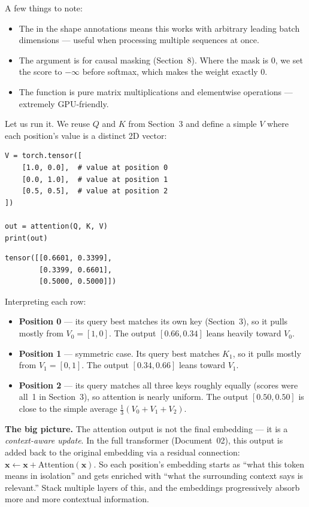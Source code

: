 A few things to note:
\begin{itemize}
  \item The \code{*} in the shape annotations means this works with arbitrary leading batch dimensions --- useful when processing multiple sequences at once.
  \item The  argument is for causal masking (Section~8). Where the mask is 0, we set the score to $-\infty$ before softmax, which makes the weight exactly 0.
  \item The function is pure matrix multiplications and elementwise operations --- extremely GPU-friendly.
\end{itemize}

Let us run it. We reuse $Q$ and $K$ from Section~3 and define a simple $V$ where each position's value is a distinct 2D vector:

\demotag
\begin{lstlisting}
V = torch.tensor([
    [1.0, 0.0],  # value at position 0
    [0.0, 1.0],  # value at position 1
    [0.5, 0.5],  # value at position 2
])

out = attention(Q, K, V)
print(out)
\end{lstlisting}

\outputtag
\begin{lstlisting}
tensor([[0.6601, 0.3399],
        [0.3399, 0.6601],
        [0.5000, 0.5000]])
\end{lstlisting}

Interpreting each row:

\begin{itemize}
  \item \textbf{Position 0} --- its query best matches its own key (Section~3), so it pulls mostly from $V_0 = [1, 0]$. The output $[0.66, 0.34]$ leans heavily toward $V_0$.
  \item \textbf{Position 1} --- symmetric case. Its query best matches $K_1$, so it pulls mostly from $V_1 = [0, 1]$. The output $[0.34, 0.66]$ leans toward $V_1$.
  \item \textbf{Position 2} --- its query matches all three keys roughly equally (scores were all~1 in Section~3), so attention is nearly uniform. The output $[0.50, 0.50]$ is close to the simple average $\frac{1}{3}(V_0 + V_1 + V_2)$.
\end{itemize}

\textbf{The big picture.} The attention output is not the final embedding --- it is a \emph{context-aware update}. In the full transformer (Document~02), this output is added back to the original embedding via a residual connection: $\mathbf{x} \leftarrow \mathbf{x} + \mathrm{Attention}(\mathbf{x})$. So each position's embedding starts as ``what this token means in isolation'' and gets enriched with ``what the surrounding context says is relevant.'' Stack multiple layers of this, and the embeddings progressively absorb more and more contextual information.

